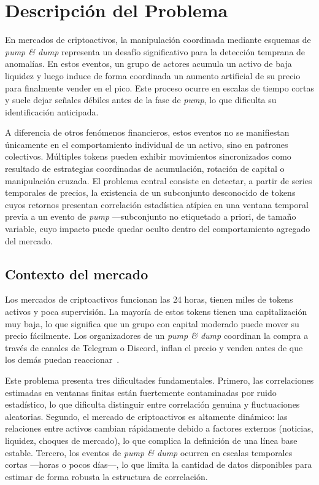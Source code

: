 \section{Descripción del Problema}

En mercados de criptoactivos, la manipulación coordinada mediante esquemas de
\emph{pump \& dump} representa un desafío significativo para la detección
temprana de anomalías. En estos eventos, un grupo de actores acumula un activo
de baja liquidez y luego induce de forma coordinada un aumento artificial de su
precio para finalmente vender en el pico. Este proceso ocurre en escalas de
tiempo cortas y suele dejar señales débiles antes de la fase de \emph{pump}, lo
que dificulta su identificación anticipada.

A diferencia de otros fenómenos financieros, estos eventos no se manifiestan
únicamente en el comportamiento individual de un activo, sino en patrones
colectivos. Múltiples tokens pueden exhibir movimientos sincronizados como
resultado de estrategias coordinadas de acumulación, rotación de capital o
manipulación cruzada. El problema central consiste en detectar, a partir de
series temporales de precios, la existencia de un subconjunto desconocido de
tokens cuyos retornos presentan correlación estadística atípica en una ventana
temporal previa a un evento de \emph{pump} ---subconjunto no etiquetado a
priori, de tamaño variable, cuyo impacto puede quedar oculto dentro del
comportamiento agregado del mercado.

\subsection{Contexto del mercado}

Los mercados de criptoactivos funcionan las 24 horas, tienen miles de tokens
activos y poca supervisión. La mayoría de estos tokens tienen una capitalización
muy baja, lo que significa que un grupo con capital moderado puede mover su
precio fácilmente. Los organizadores de un \emph{pump \& dump} coordinan la
compra a través de canales de Telegram o Discord, inflan el precio y venden
antes de que los demás puedan reaccionar~\cite{lamorgia2023}.

Este problema presenta tres dificultades fundamentales. Primero, las
correlaciones estimadas en ventanas finitas están fuertemente contaminadas
por ruido estadístico, lo que dificulta distinguir entre correlación genuina
y fluctuaciones aleatorias. Segundo, el mercado de criptoactivos es altamente
dinámico: las relaciones entre activos cambian rápidamente debido a factores
externos (noticias, liquidez, choques de mercado), lo que complica la
definición de una línea base estable. Tercero, los eventos de \emph{pump \&
dump} ocurren en escalas temporales cortas ---horas o pocos días---, lo que
limita la cantidad de datos disponibles para estimar de forma robusta la
estructura de correlación.

